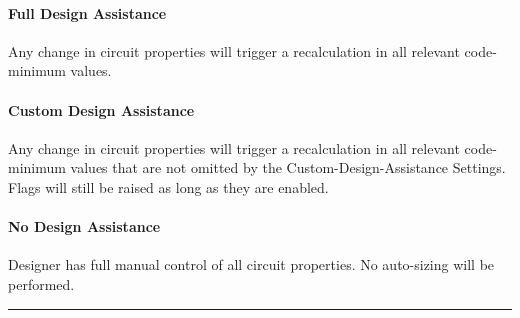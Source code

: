 \documentclass[letterpaper,10pt,english]{sphinxmanual}
\begin{document}
\paragraph{Full Design Assistance}
\label{\detokenize{docs/userguide/explorersandutilitytools/statusbar/index-status_bar:full-design-assistance}}\label{\detokenize{docs/userguide/explorersandutilitytools/statusbar/index-status_bar:id3}}
Any change in circuit properties will trigger a recalculation in all relevant code-minimum values.

\begin{figure}[H]
\centering

\noindent{}
\end{figure}


\paragraph{Custom Design Assistance}
\label{\detokenize{docs/userguide/explorersandutilitytools/statusbar/index-status_bar:custom-design-assistance}}\label{\detokenize{docs/userguide/explorersandutilitytools/statusbar/index-status_bar:id4}}
Any change in circuit properties will trigger a recalculation in all relevant code-minimum values that are not omitted by the Custom-Design-Assistance Settings.  Flags will still be raised as long as they are enabled.

\begin{figure}[H]
\centering

\noindent{}
\end{figure}


\paragraph{No Design Assistance}
\label{\detokenize{docs/userguide/explorersandutilitytools/statusbar/index-status_bar:no-design-assistance}}\label{\detokenize{docs/userguide/explorersandutilitytools/statusbar/index-status_bar:id5}}
Designer has full manual control of all circuit properties.  No auto-sizing will be performed.

\begin{figure}[H]
\centering

\noindent{}
\end{figure}


\bigskip\hrule\bigskip
\end{document}
